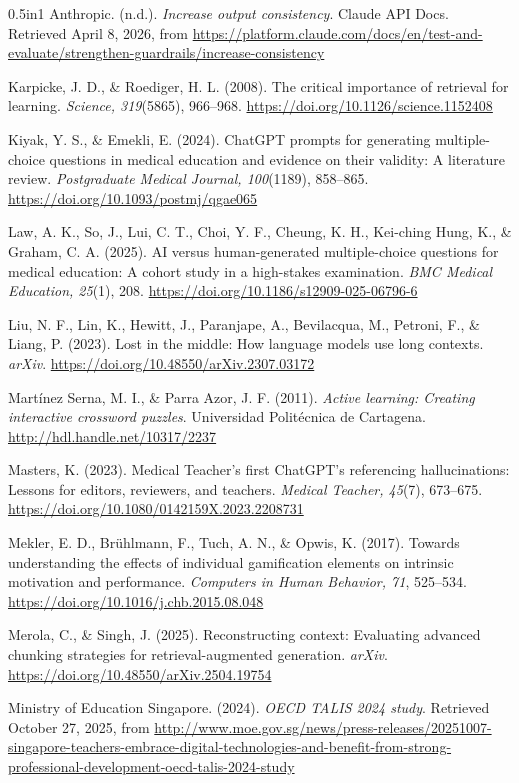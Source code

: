 \documentclass[
  12pt,
  a4paper,
]{report}
\begin{document}
\begin{hangparas}{0.5in}{1}
Anthropic. (n.d.). \textit{Increase output consistency}. Claude API Docs. Retrieved April 8, 2026, from \url{https://platform.claude.com/docs/en/test-and-evaluate/strengthen-guardrails/increase-consistency}

Karpicke, J. D., \& Roediger, H. L. (2008). The critical importance of retrieval for learning. \textit{Science, 319}(5865), 966--968. \url{https://doi.org/10.1126/science.1152408}

Kiyak, Y. S., \& Emekli, E. (2024). ChatGPT prompts for generating multiple-choice questions in medical education and evidence on their validity: A literature review. \textit{Postgraduate Medical Journal, 100}(1189), 858--865. \url{https://doi.org/10.1093/postmj/qgae065}

Law, A. K., So, J., Lui, C. T., Choi, Y. F., Cheung, K. H., Kei-ching Hung, K., \& Graham, C. A. (2025). AI versus human-generated multiple-choice questions for medical education: A cohort study in a high-stakes examination. \textit{BMC Medical Education, 25}(1), 208. \url{https://doi.org/10.1186/s12909-025-06796-6}

Liu, N. F., Lin, K., Hewitt, J., Paranjape, A., Bevilacqua, M., Petroni, F., \& Liang, P. (2023). Lost in the middle: How language models use long contexts. \textit{arXiv}. \url{https://doi.org/10.48550/arXiv.2307.03172}

Martínez Serna, M. I., \& Parra Azor, J. F. (2011). \textit{Active learning: Creating interactive crossword puzzles}. Universidad Politécnica de Cartagena. \url{http://hdl.handle.net/10317/2237}

Masters, K. (2023). Medical Teacher's first ChatGPT's referencing hallucinations: Lessons for editors, reviewers, and teachers. \textit{Medical Teacher, 45}(7), 673--675. \url{https://doi.org/10.1080/0142159X.2023.2208731}

Mekler, E. D., Brühlmann, F., Tuch, A. N., \& Opwis, K. (2017). Towards understanding the effects of individual gamification elements on intrinsic motivation and performance. \textit{Computers in Human Behavior, 71}, 525--534. \url{https://doi.org/10.1016/j.chb.2015.08.048}

Merola, C., \& Singh, J. (2025). Reconstructing context: Evaluating advanced chunking strategies for retrieval-augmented generation. \textit{arXiv}. \url{https://doi.org/10.48550/arXiv.2504.19754}

Ministry of Education Singapore. (2024). \textit{OECD TALIS 2024 study}. Retrieved October 27, 2025, from \url{http://www.moe.gov.sg/news/press-releases/20251007-singapore-teachers-embrace-digital-technologies-and-benefit-from-strong-professional-development-oecd-talis-2024-study}


\end{hangparas}
\end{document}

